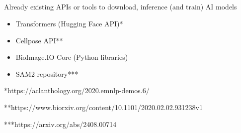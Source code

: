\subsection{\slidetitle}
\begin{frame}
  \frametitle{\sectiontitle}
  \framesubtitle{\slidetitle}

  Already existing APIs or tools to download, inference (and train) AI models
  \begin{itemize}
    \item Transformers (Hugging Face API)*
    \item Cellpose API**
    \item BioImage.IO Core (Python libraries)
    \item SAM2 repository***
  \end{itemize}

  \bigskip
  \bigskip

  *https://aclanthology.org/2020.emnlp-demos.6/

  **https://www.biorxiv.org/content/10.1101/2020.02.02.931238v1

  ***https://arxiv.org/abs/2408.00714
\end{frame}

\def\slidetitle{Our approach}

